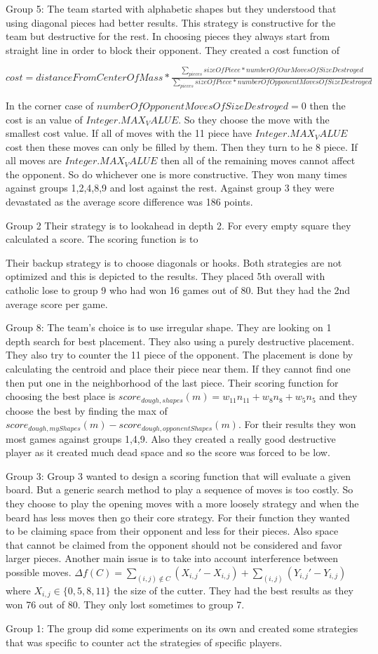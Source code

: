 Group 5:
The team started with alphabetic shapes but they understood that using diagonal
pieces had better results. This strategy is constructive for the team but destructive
for the rest. In choosing pieces they always start from straight line in order to
block their opponent. They created a cost function of 

$cost = distanceFromCenterOfMass * 
\frac{\sum_{pieces}{sizeOfPiece*numberOfOurMovesOfSizeDestroyed}}{\sum_{pieces}{sizeOfPiece*numberOfOpponentMovesOfSizeDestroyed}}$

In the corner case of $numberOfOpponentMovesOfSizeDestroyed = 0$ then the cost 
is an value of $Integer.MAX_VALUE$. So they choose the move with the smallest cost
value. If all of moves with the 11 piece have $Integer.MAX_VALUE$ cost then these
moves can only be filled by them. Then they turn to he 8 piece. If all moves are
$Integer.MAX_VALUE$ then all of the remaining moves cannot affect the opponent.
So do whichever one is more constructive. They won many times against groups 
1,2,4,8,9 and lost against the rest. Against group 3 they were devastated as the
average score difference was 186 points. 

Group 2
Their strategy is to lookahead in depth 2. For every empty square they calculated
a score. The scoring function is to  

Their backup strategy is to choose diagonals or hooks. Both strategies are not 
optimized and this is depicted to the results. They placed 5th overall with
catholic lose to group 9 who had won 16 games out of 80. But they had the 2nd
average score per game.

Group 8:
The team's choice is to use irregular shape. They are looking on 1 depth search
for best placement. They also using a purely destructive placement. They also 
try to counter the 11 piece of the opponent. The placement is done by calculating
the centroid and place their piece near them. If they cannot find one then put 
one in the neighborhood of the last piece. Their scoring function for choosing 
the best place is $score_{dough,shapes}(m) = w_{11}n_{11} + w_8n_8 + w_5n_5$ and
they choose the best by finding the max of $score_{dough,myShapes}(m) - 
score_{dough,opponentShapes}(m)$. For their results they won most games against
groups 1,4,9. Also they created a really good destructive player as it created
much dead space and so the score was forced to be low.

Group 3:
Group 3 wanted to design a scoring function that will evaluate a given board.
But a generic search method to play a sequence of moves is too costly. So they 
choose to play the opening moves with a more loosely strategy and when the beard
has less moves then go their core strategy. For their function they wanted to be 
claiming space from their opponent and less for their pieces. Also space that 
cannot be claimed from the opponent should not be considered and favor larger 
pieces. Another main issue is to take into account interference between possible
moves. 
$\Delta f(C) = \sum\limits_{(i,j)\notin C} (X_{i,j}' - X_{i,j}) + \sum\limits_{(i,j)} (Y_{i,j}' - Y_{i,j})$ 
where $X_{i,j} \in \{0,5,8,11\}$ the size of the cutter. They had the best results
as they won 76 out of 80. They only lost sometimes to group 7.

Group 1:
The group did some experiments on its own and created some strategies that was
specific to counter act the strategies of specific players.


